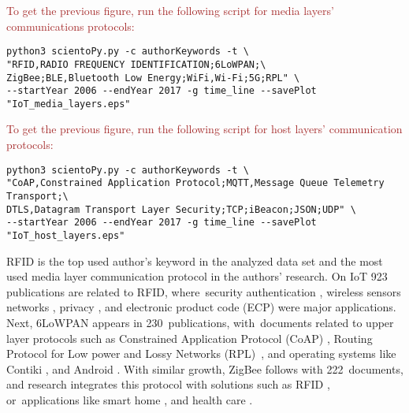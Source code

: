 \documentclass[symmetry,article,accept,moreauthors,pdftex10pt,a4paper]{mdpi}
\begin{document}
\noindent
\textcolor{brown}{To get the previous figure, run the following script for media layers' communications protocols:}\\
\begin{verbatim}
python3 scientoPy.py -c authorKeywords -t \
"RFID,RADIO FREQUENCY IDENTIFICATION;6LoWPAN;\
ZigBee;BLE,Bluetooth Low Energy;WiFi,Wi-Fi;5G;RPL" \
--startYear 2006 --endYear 2017 -g time_line --savePlot "IoT_media_layers.eps"
\end{verbatim}

\noindent
\textcolor{brown}{To get the previous figure, run the following script for host layers' communication protocols:}\\
\begin{verbatim}
python3 scientoPy.py -c authorKeywords -t \
"CoAP,Constrained Application Protocol;MQTT,Message Queue Telemetry Transport;\
DTLS,Datagram Transport Layer Security;TCP;iBeacon;JSON;UDP" \
--startYear 2006 --endYear 2017 -g time_line --savePlot "IoT_host_layers.eps"
\end{verbatim}



RFID is the top used author's keyword in the analyzed data set and the most used media layer communication protocol in the authors' research. On IoT 923 publications are related to RFID, where~security authentication \cite{Yuan2016,Li20124971,Li2016}, wireless sensors networks \cite{Hamza2016267,6322530}, privacy \cite{Wu20151224,Burmester2014317}, and electronic product code (ECP) \cite{Yan201255,Xu201140} were major applications. Next, 6LoWPAN appears in 230~publications, with~documents related to upper layer protocols such as Constrained Application Protocol (CoAP) \cite{Castellani201471,Bimschas2012}, Routing Protocol for Low power and Lossy Networks (RPL)~\cite{Pongle2015,Hellaoui201525}, and operating systems like Contiki \cite{Bragg20161273,Caputo2012770}, and Android \cite{Wang201549,Schleiss201214}. With similar growth, ZigBee follows with 222~documents, and research integrates this protocol with solutions such as RFID \cite{Fan2012732,Alharbe2013191,zhang2014}, or~applications like smart home \cite{Yiqi2014114,Yi2016128,wang2013}, and health care \cite{Kodali2016411,Spano20165452,Rosner201444}.
\end{document}
